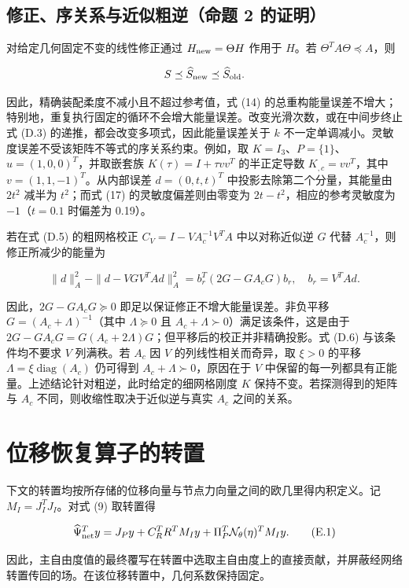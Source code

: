 \documentclass[preprint,12pt,authoryear]{elsarticle}
\begin{document}
\subsection{修正、序关系与近似粗逆（命题 2 的证明）}

对给定几何固定不变的线性修正通过 \(H_{\rm new}=\Theta H\) 作用于 \(H\)。若 \(\Theta^TA\Theta\preceq A\)，则

\[
S\preceq\widehat S_{\rm new}\preceq\widehat S_{\rm old}.
\]

因此，精确装配柔度不减小且不超过参考值，式 (14) 的总重构能量误差不增大；特别地，重复执行固定的循环不会增大能量误差。改变光滑次数，或在中间步终止式 (D.3) 的递推，都会改变多项式，因此能量误差关于 \(k\) 不一定单调减小。灵敏度误差不受该矩阵不等式的序关系约束。例如，取 \(K=I_3\)、\(P=\{1\}\)、\(u=(1,0,0)^T\)，并取嵌套族 \(K(\tau)=I+\tau vv^T\) 的半正定导数 \(K_{,c}=vv^T\)，其中 \(v=(1,1,-1)^T\)。从内部误差 \(d=(0,t,t)^T\) 中投影去除第二个分量，其能量由 \(2t^2\) 减半为 \(t^2\)；而式 (17) 的灵敏度偏差则由零变为 \(2t-t^2\)，相应的参考灵敏度为 \(-1\)（\(t=0.1\) 时偏差为 0.19）。

若在式 (D.5) 的粗网格校正 \(C_V=I-VA_c^{-1}V^TA\) 中以对称近似逆 \(G\) 代替 \(A_c^{-1}\)，则修正所减少的能量为

\[
\|d\|_A^2-\|d-VGV^TAd\|_A^2
=b_r^T(2G-GA_cG)b_r,\quad b_r=V^TAd.
\tag{D.6}
\]

因此，\(2G-GA_cG\succeq0\) 即足以保证修正不增大能量误差。非负平移 \(G=(A_c+\Lambda)^{-1}\)（其中 \(\Lambda\succeq0\) 且 \(A_c+\Lambda\succ0\)）满足该条件，这是由于 \(2G-GA_cG=G(A_c+2\Lambda)G\)；但平移后的校正并非精确投影。式 (D.6) 与该条件均不要求 \(V\) 列满秩。若 \(A_c\) 因 \(V\) 的列线性相关而奇异，取 \(\xi>0\) 的平移 \(\Lambda=\xi\operatorname{diag}(A_c)\) 仍可得到 \(A_c+\Lambda\succ0\)，原因在于 \(V\) 中保留的每一列都具有正能量。上述结论针对粗逆，此时给定的细网格刚度 \(K\) 保持不变。若探测得到的矩阵与 \(A_c\) 不同，则收缩性取决于近似逆与真实 \(A_c\) 之间的关系。

\section{位移恢复算子的转置}

下文的转置均按所存储的位移向量与节点力向量之间的欧几里得内积定义。记 \(M_I=J_I^TJ_I\)。对式 (9) 取转置得

\[
\widehat\Psi_{\rm net}^Ty=J_Py+C_R^TR^TM_Iy
 +\Pi_P^T\mathcal N_\theta(\eta)^TM_Iy.
\tag{E.1}
\]

因此，主自由度值的最终覆写在转置中选取主自由度上的直接贡献，并屏蔽经网络转置传回的场。在该位移转置中，几何系数保持固定。
\end{document}
